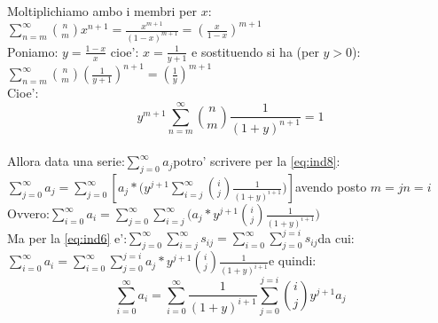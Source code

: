 \documentclass[12pt,a4paper]{article}
\begin{document}
\begin{flushleft}
\vspace{5mm}
Moltiplichiamo ambo i membri per $x$:\hspace{10mm}$\sum_{n=m}^{\infty}{}\binom{n}{m}x^{n+1}=\frac{x^{m+1}}{(1-x)^{m+1}}=(\frac{x}{1-x})^{m+1}$\\
\vspace{5mm}
Poniamo:  $y=\frac{1-x}{x}$  cioe':  $x=\frac{1}{y+1}$   e sostituendo si ha (per $y>0$): \\
\vspace{5mm}
$\sum_{n=m}^{\infty}{}\binom{n}{m}(\frac{1}{y+1})^{n+1}=(\frac{1}{y})^{m+1}$\\
\vspace{5mm}
Cioe':\\
\begin{equation}
\label{eq:ind8}
{y}^{m+1}\sum_{n=m}^{\infty}{\binom{n}{m}\frac{1}{({1+y})^{n+1}}}=1
\end{equation}
\\
\vspace{5mm}
Allora data una serie:\hspace{10mm}$\sum_{j=0}^{\infty}{a_j}$\hspace{10mm}potro' scrivere per la \eqref{eq:ind8}:\\
\vspace{5mm}
$\sum_{j=0}^{\infty}{a_j}=\sum_{j=0}^{\infty}[{{a_j}*({y}^{j+1}\sum_{i=j}^{\infty}{\binom{i}{j}\frac{1}{({1+y})^{i+1}}}})]$\hspace{5mm}avendo posto $m=j$\hspace{5mm}$n=i$\\
\vspace{5mm}
Ovvero:\hspace{10mm}$\sum_{i=0}^{\infty}{a_i}=\sum_{j=0}^{\infty}{\sum_{i=j}^{\infty}({{a_j}*{y}^{j+1}\binom{i}{j}\frac{1}{({1+y})^{i+1}}}})$\\
\vspace{5mm}
Ma per la \eqref{eq:ind6} e':\hspace{10mm}$\sum_{j=0}^{\infty}{\sum_{i=j}^{\infty}{s_{ij}}}=\sum_{i=0}^{\infty}{\sum_{j=0}^{j=i}{s_{ij}}}$\hspace{5mm}da cui:\\
\vspace{5mm}
$\sum_{i=0}^{\infty}{a_i}=\sum_{i=0}^{\infty}{\sum_{j=0}^{j=i}{{a_j}*{y}^{j+1}}\binom{i}{j}\frac{1}{({1+y})^{i+1}}}$\hspace{10mm}e quindi:\\
\pagebreak
\begin{equation}
\label{eq:ind9}
\sum_{i=0}^{\infty}{a_i}=\sum_{i=0}^{\infty}{\frac{1}{({1+y})^{i+1}}\sum_{j=0}^{j=i}{\binom{i}{j}{y}^{j+1}}{a_j}}

\end{equation}
\end{flushleft}
\end{document}
